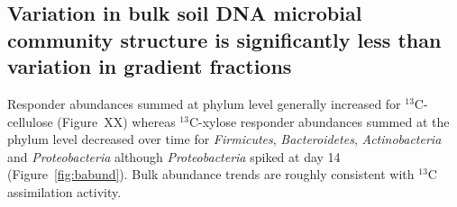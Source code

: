 \subsection{Variation in bulk soil DNA microbial community structure is
significantly less than variation in gradient fractions} 
Responder abundances summed at phylum level generally 
increased for $^{13}$C-cellulose (Figure~XX) whereas $^{13}$C-xylose responder abundances 
summed at the phylum level decreased over time for \textit{Firmicutes}, \textit{Bacteroidetes},
\textit{Actinobacteria} and \textit{Proteobacteria} although 
\textit{Proteobacteria} spiked at day 14 (Figure~\ref{fig:babund}). Bulk abundance trends are
roughly consistent with $^{13}$C assimilation activity. 